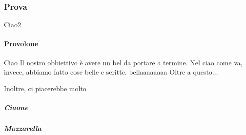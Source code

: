 \subsubsection{Prova}

Ciao2

\paragraph{Provolone}

Ciao Il nostro obbiettivo è avere un bel  da portare a termine. Nel  ciao come va, invece, abbiamo fatto cose belle e scritte. bellaaaaaaaa Oltre a questo... 


Inoltre, ci piacerebbe molto \lipsum[1]


\subparagraph{Ciaone}

\lipsum[1]

\subparagraph{Mozzarella}

\lipsum[1]